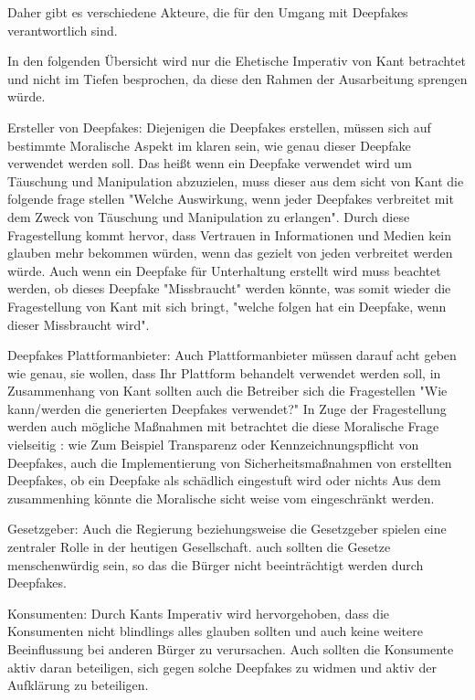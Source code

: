 \documentclass[a4paper,12pt]{article}
\begin{document}
Daher gibt es verschiedene Akteure, die für den Umgang mit Deepfakes verantwortlich sind.

In den folgenden Übersicht wird nur die Ehetische Imperativ von Kant betrachtet und nicht im Tiefen besprochen, da diese den Rahmen der Ausarbeitung sprengen würde.

Ersteller von Deepfakes:
Diejenigen die Deepfakes erstellen, müssen sich auf bestimmte Moralische Aspekt im klaren sein, wie genau dieser Deepfake verwendet werden soll. Das heißt wenn ein Deepfake verwendet wird um Täuschung und Manipulation abzuzielen, muss  dieser aus dem sicht von Kant die folgende frage stellen "Welche Auswirkung, wenn jeder Deepfakes verbreitet mit dem Zweck von Täuschung und Manipulation zu erlangen". Durch diese Fragestellung kommt hervor, dass Vertrauen in Informationen und Medien kein glauben mehr bekommen würden, wenn das gezielt von jeden verbreitet werden würde. Auch wenn ein Deepfake für Unterhaltung erstellt wird muss beachtet werden, ob dieses Deepfake "Missbraucht" werden könnte, was somit wieder die Fragestellung von Kant mit sich bringt, "welche folgen hat ein Deepfake, wenn dieser Missbraucht wird".\cite{IJS2025}\cite{KantMetaphysik}

Deepfakes Plattformanbieter:
Auch Plattformanbieter müssen darauf acht geben wie  genau, sie wollen, dass Ihr Plattform behandelt verwendet werden soll, in Zusammenhang von Kant sollten auch die Betreiber sich die Fragestellen "Wie kann/werden die generierten Deepfakes verwendet?" In Zuge der Fragestellung werden auch mögliche Maßnahmen mit betrachtet die diese Moralische Frage vielseitig : wie Zum Beispiel Transparenz oder Kennzeichnungspflicht von Deepfakes, auch die Implementierung von Sicherheitsmaßnahmen von erstellten Deepfakes, ob ein Deepfake als schädlich eingestuft wird oder nichts
Aus dem zusammenhing könnte die Moralische sicht weise vom eingeschränkt werden.
\cite{Brennan2024}\cite{KantMetaphysik}

Gesetzgeber:
Auch die Regierung beziehungsweise die Gesetzgeber spielen eine zentraler Rolle  in der heutigen Gesellschaft. auch sollten die Gesetze menschenwürdig sein, so das die Bürger nicht beeinträchtigt werden durch Deepfakes.\cite{ThomsonReuters2024}\cite{KantMetaphysik}

Konsumenten:
Durch Kants Imperativ wird hervorgehoben, dass die Konsumenten nicht blindlings alles glauben sollten 
und auch keine weitere Beeinflussung bei anderen Bürger zu verursachen.
Auch sollten die Konsumente aktiv daran beteiligen, sich gegen solche Deepfakes zu widmen und aktiv der Aufklärung zu beteiligen.\cite{UNR2023}\cite{KantMetaphysik}
\newpage
\end{document}
